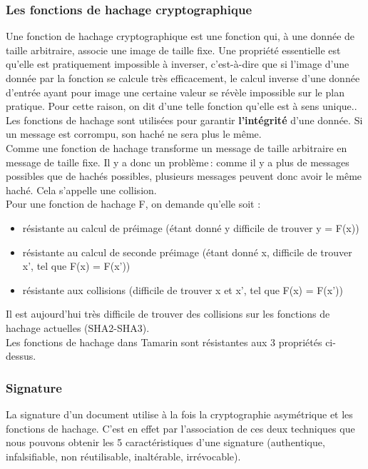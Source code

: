 \documentclass[conference]{IEEEtran}
\begin{document}
\subsubsection{Les fonctions de hachage cryptographique}
Une fonction de hachage cryptographique est une fonction qui, à une donnée de taille arbitraire, associe une image de taille fixe. Une propriété essentielle est qu'elle est pratiquement impossible à inverser, c'est-à-dire que si l'image d'une donnée par la fonction se calcule très efficacement, le calcul inverse d'une donnée d'entrée ayant pour image une certaine valeur se révèle impossible sur le plan pratique. Pour cette raison, on dit d'une telle fonction qu'elle est à sens unique.\cite{wikihash, ryxhash}. Les fonctions de hachage sont utilisées pour garantir \textbf{l'intégrité} d'une donnée. Si un message est corrompu, son haché ne sera plus le même. \cite{igmsign}\\
Comme une fonction de hachage transforme un message de taille arbitraire en message de taille fixe. Il y a donc un problème : comme il y a plus de messages possibles que de hachés possibles, plusieurs messages peuvent donc avoir le même haché. Cela s'appelle une collision. \cite{ryxhash, cryptohash}\\
Pour une fonction de hachage F, on demande qu'elle soit :
\begin{itemize}
    \item résistante au calcul de préimage (étant donné y difficile de trouver y = F(x))
    \item résistante au calcul de seconde préimage (étant donné x, difficile de trouver x', tel que F(x) = F(x'))
    \item résistante aux collisions (difficile de trouver x et x', tel que F(x) = F(x'))
\end{itemize}
Il est aujourd'hui très difficile de trouver des collisions sur les fonctions de hachage actuelles (SHA2-SHA3). \\
Les fonctions de hachage dans Tamarin sont résistantes aux 3 propriétés ci-dessus. \\

\subsubsection{Signature}
La signature d'un document utilise à la fois la cryptographie asymétrique et les fonctions de hachage. C'est en effet par l'association de ces deux techniques que nous pouvons obtenir les 5 caractéristiques d'une signature (authentique, infalsifiable, non réutilisable, inaltérable, irrévocable). \cite{igmsign}
\end{document}

